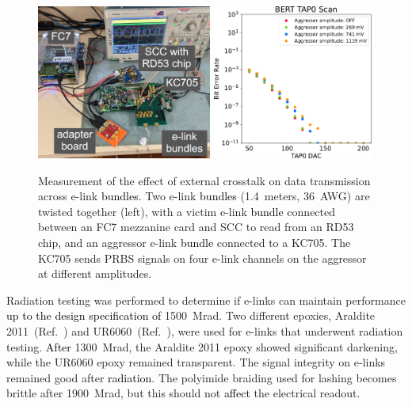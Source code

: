 \documentclass[a4paper,11pt]{article}
\newcommand{\mrad}{Mrad}
\newcommand{\black}{\textcolor{black}}
\begin{document}
\begin{figure}[htbp]
\centering
\includegraphics[height=2.0in,origin=c]{../figures/external_crosstalk_setup_labeled.jpeg}
\hspace*{.2in}
\includegraphics[height=2.0in,origin=c]{../figures/BERT_TAP0_Scan_External_Crosstalk-crop.pdf}
\caption{
\label{fig:external_crosstalk}
Measurement of the effect of external crosstalk on data transmission across e-link \black{bundles}.
Two e-link \black{bundles} (1.4~meters, 36~AWG) are twisted together (left), with a victim e-link \black{bundle} connected between an FC7 mezzanine card and SCC to read from an RD53 chip, and an aggressor e-link \black{bundle} connected to a KC705.
The KC705 sends PRBS signals on four e-link channels on the aggressor at different amplitudes.
}
\end{figure}

Radiation testing was performed to determine if e-links can maintain performance \black{up to the design specification of} 1500~\mrad.
Two different epoxies, Araldite 2011~(Ref.~\cite{ref:araldite}) and UR6060~(Ref.~\cite{ref:ur}), were used for e-links that underwent radiation testing.
\black{After} 1300~\mrad, the Araldite 2011 epoxy showed significant darkening, while the UR6060 epoxy remained transparent.
The signal integrity on e-links remained good after \black{radiation}.
The polyimide braiding used for lashing becomes brittle after 1900~\mrad, but this should not \black{affect} the electrical readout.
\end{document}
